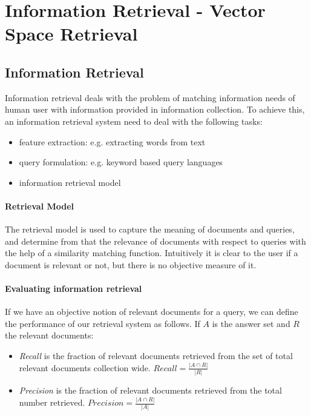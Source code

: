 \newcommand{\specialcell}[2][tl]{%
  \begin{tabular}[#1]{@{}c@{}}#2\end{tabular}}

\section{Information Retrieval - Vector Space Retrieval}


\subsection{Information Retrieval}
Information retrieval deals with the problem of matching information needs of human user with information provided in information collection. To achieve this, an information retrieval system need to deal with the following tasks:
\begin{itemize}
\item feature extraction: e.g. extracting words from text
\item query formulation: e.g. keyword based query languages
\item information retrieval model
\end{itemize}
\paragraph{Retrieval Model} 

The retrieval model is used to capture the meaning of documents and queries, and determine from that the relevance of documents with respect to queries with the help of a similarity matching function. Intuitively it is clear to the user if a document is relevant or not, but there is no objective measure of it.
\paragraph{Evaluating information retrieval}
If we have an objective notion of relevant documents for a query, we can define the performance of our retrieval system as follows.
If $A$ is the answer set and $R$ the relevant documents:
\begin{itemize}
\item \textit{Recall} is the fraction of relevant documents retrieved from the set of total relevant documents collection wide. $Recall = \frac{| A \cap R|}{|R|}$
\item \textit{Precision} is the fraction of relevant documents retrieved from the total number retrieved. $Precision = \frac{|A\cap R|}{|A|}$
\end{itemize}

